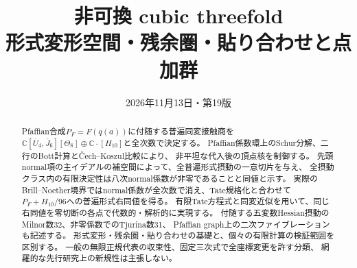 \documentclass[a4paper,11pt]{ltjsarticle}
\title{\bfseries 非可換 cubic threefold\\[0.35em]
\large 形式変形空間・残余圏・貼り合わせと点加群}
\author{}
\date{2026年11月13日・第19版}
\theoremstyle{definition}
\newcommand{\CC}{\mathbb C}
\begin{document}
\maketitle
\vspace{-1.5em}
\begin{abstract}
Pfaffian合成$P_F=F(q(a))$に付随する普遍同変接触商を
$\CC[\overline U_4,\overline J_6][\Theta_8]\oplus\CC\cdot[H_{10}]$と全次数で決定する。
Pfaffian係数環上のSchur分解、二行のBott計算と\v{C}ech--Koszul比較により、
非平坦な代入後の頂点核を制御する。
先頭normal項の主イデアルの補空間によって、全普遍形式摂動の一意切片を与え、
全摂動クラス内の有限決定性は八次normal係数が非零であることと同値と示す。
実際のBrill--Noether境界ではnormal係数が全次数で消え、Tate規格化と合わせて
$P_F+H_{10}/96$への普遍形式右同値を得る。
有限Tate方程式と同変近似を用いて、同じ右同値を零切断の各点で代数的・解析的に実現する。
付随する五変数Hessian摂動のMilnor数32、非零係数でのTjurina数31、
Pfaffian graph上の二次ファイブレーションも記述する。
形式変形・残余圏・貼り合わせの基礎と、個々の有限計算の検証範囲を区別する。
一般の無限正規代表の収束性、固定三次式で全座標変更を許す分類、
網羅的な先行研究上の新規性は主張しない。
\end{abstract}













\end{document}
